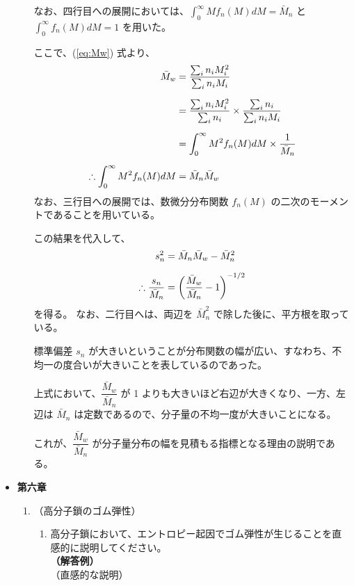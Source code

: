 \documentclass[a4paper,11pt]{ltjsarticle}
\begin{document}
\begin{itemize}
\begin{enumerate}
	なお、四行目への展開においては、$\displaystyle \int_0^{\infty} M f_n(M) dM = \bar{M}_n$ と $\displaystyle \int_0^{\infty} f_n(M) dM = 1$ を用いた。

	ここで、(\ref{eq:Mw}) 式より、
	\begin{align}
	{\bar M}_w 
		&= \dfrac{\sum_i n_i M_i^2}{\sum_i n_i M_i}\notag \\[6pt]
		&= \dfrac{\sum_i n_i M_i^2}{\sum_i n_i} \times \dfrac{\sum_i n_i}{\sum_i n_i M_i}\notag \\[6pt]
		&= \displaystyle \int_0^{\infty} M^2 f_n(M) dM \times \dfrac{1}{\bar{M}_n }\notag \\[6pt]
	\therefore \displaystyle \int_0^{\infty} M^2 f_n(M) dM &= \bar{M}_n \bar{M}_w
	\end{align}
	なお、三行目への展開では、数微分分布関数 $f_n(M)$ の二次のモーメントであることを用いている。

	この結果を代入して、
	\begin{align}
	s_n^2 &= \bar{M}_n \bar{M}_w - \bar{M}_n^2\notag \\[6pt]
	\therefore \dfrac{s_n}{\bar{M}_n} &= \left(\dfrac{\bar{M}_w}{ \bar{M}_n} - 1 \right)^{-1/2}
	\end{align}
	を得る。
	なお、二行目へは、両辺を $\bar{M}_n^2$ で除した後に、平方根を取っている。

	標準偏差 $s_n$ が大きいということが分布関数の幅が広い、すなわち、不均一の度合いが大きいことを表しているのであった。

	上式において、$\dfrac{\bar{M}_w}{\bar{M}_n}$ が 1 よりも大きいほど右辺が大きくなり、一方、左辺は $\bar{M}_n$ は定数であるので、分子量の不均一度が大きいことになる。

	これが、$\dfrac{\bar{M}_w}{\bar{M}_n}$ が分子量分布の幅を見積もる指標となる理由の説明である。

	\end{enumerate}

\item
{\bf 第六章}
	\begin{enumerate}
	\item
	（高分子鎖のゴム弾性）\\
		\vspace{-5mm}
		\begin{enumerate}
		\item
		\label{it:5-1}
		高分子鎖において、エントロピー起因でゴム弾性が生じることを直感的に説明してください。\\
		{\bf（解答例）}\\
		（直感的な説明）


\end{enumerate}
\end{enumerate}
\end{itemize}
\end{document}
